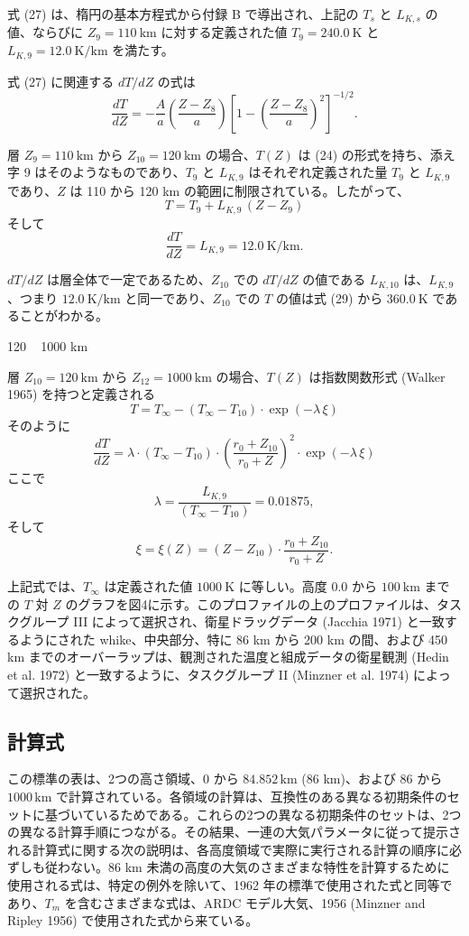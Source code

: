 \documentclass{article}
\begin{document}
式 (27) は、楕円の基本方程式から付録 B で導出され、上記の $T_s$ と $L_{K,s}$ の値、ならびに $Z_9 = 110~\text{km}$ に対する定義された値 $T_9 = 240.0~\text{K}$ と $L_{K,9} = 12.0~\text{K/km}$ を満たす。

式 (27) に関連する $dT/dZ$ の式は
\[
\frac{dT}{dZ} = -\frac{A}{a} \left(\frac{Z - Z_8}{a} \right) \left[1 - \left(\frac{Z - Z_8}{a} \right)^2 \right]^{-1/2}. \tag{28}
\]

層 $Z_9 = 110~\text{km}$ から $Z_{10} = 120~\text{km}$ の場合、$T(Z)$ は (24) の形式を持ち、添え字 9 はそのようなものであり、$T_9$ と $L_{K,9}$ はそれぞれ定義された量 $T_9$ と $L_{K,9}$ であり、$Z$ は 110 から 120 km の範囲に制限されている。したがって、
\[
T = T_9 + L_{K,9} \, (Z - Z_9) \tag{29}
\]
そして
\[
\frac{dT}{dZ} = L_{K,9} = 12.0~\text{K/km}. \tag{30}
\]

$dT/dZ$ は層全体で一定であるため、$Z_{10}$ での $dT/dZ$ の値である $L_{K,10}$ は、$L_{K,9}$、つまり $12.0~\text{K/km}$ と同一であり、$Z_{10}$ での $T$ の値は式 (29) から $360.0~\text{K}$ であることがわかる。

120 ~ 1000 km

層 $Z_{10} = 120~\text{km}$ から $Z_{12} = 1000~\text{km}$ の場合、$T(Z)$ は指数関数形式 (Walker 1965) を持つと定義される
\[
T = T_{\infty} - (T_{\infty} - T_{10}) \cdot \exp(-\lambda \, \xi) \tag{31}
\]
そのように
\[
\frac{dT}{dZ} = \lambda \cdot (T_{\infty} - T_{10}) \cdot \left(\frac{r_0 + Z_{10}}{r_0 + Z}\right)^2 \cdot \exp(-\lambda \, \xi) \tag{32}
\]
ここで
\[
\lambda = \frac{L_{K,9}}{(T_{\infty} - T_{10})} = 0.01875,
\]
そして
\[
\xi = \xi(Z) = \left(Z - Z_{10}\right)\cdot\frac{r_0 + Z_{10}}{r_0 + Z}.
\]

上記式では、$T_{\infty}$ は定義された値 $1000~\text{K}$ に等しい。高度 $0.0$ から $100~\text{km}$ までの $T$ 対 $Z$ のグラフを図4に示す。このプロファイルの上のプロファイルは、タスクグループ III によって選択され、衛星ドラッグデータ (Jacchia 1971) と一致するようにされた whike、中央部分、特に 86 km から 200 km の間、および 450 km までのオーバーラップは、観測された温度と組成データの衛星観測 (Hedin et al. 1972) と一致するように、タスクグループ II (Minzner et al. 1974) によって選択された。

\subsection{計算式}

この標準の表は、2つの高さ領域、$0$ から $84.852 \, \text{km}$ (86 km)、および $86$ から $1000 \, \text{km}$ で計算されている。各領域の計算は、互換性のある異なる初期条件のセットに基づいているためである。これらの2つの異なる初期条件のセットは、2つの異なる計算手順につながる。その結果、一連の大気パラメータに従って提示される計算式に関する次の説明は、各高度領域で実際に実行される計算の順序に必ずしも従わない。86 km 未満の高度の大気のさまざまな特性を計算するために使用される式は、特定の例外を除いて、1962 年の標準で使用された式と同等であり、$T_m$ を含むさまざまな式は、ARDC モデル大気、1956 (Minzner and Ripley 1956) で使用された式から来ている。
\end{document}
